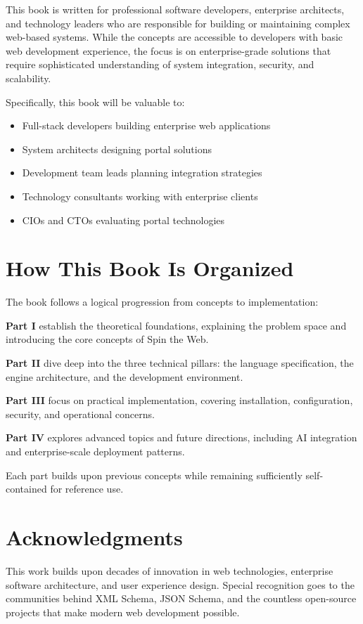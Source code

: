 This book is written for professional software developers, enterprise architects, and technology leaders who are responsible for building or maintaining complex web-based systems. While the concepts are accessible to developers with basic web development experience, the focus is on enterprise-grade solutions that require sophisticated understanding of system integration, security, and scalability.

Specifically, this book will be valuable to:
\begin{itemize}
\item Full-stack developers building enterprise web applications
\item System architects designing portal solutions
\item Development team leads planning integration strategies
\item Technology consultants working with enterprise clients
\item CIOs and CTOs evaluating portal technologies
\end{itemize}

\section*{How This Book Is Organized}

The book follows a logical progression from concepts to implementation:

\textbf{Part I} establish the theoretical foundations, explaining the problem space and introducing the core concepts of Spin the Web.

\textbf{Part II} dive deep into the three technical pillars: the \wbdl language specification, the \webspinner engine architecture, and the \studio development environment.

\textbf{Part III} focus on practical implementation, covering installation, configuration, security, and operational concerns.

\textbf{Part IV} explores advanced topics and future directions, including AI integration and enterprise-scale deployment patterns.

Each part builds upon previous concepts while remaining sufficiently self-contained for reference use.

\section*{Acknowledgments}

This work builds upon decades of innovation in web technologies, enterprise software architecture, and user experience design. Special recognition goes to the communities behind XML Schema, JSON Schema, and the countless open-source projects that make modern web development possible.

